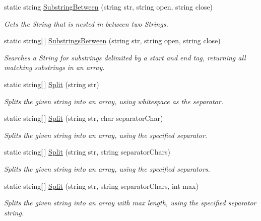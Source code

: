 \begin{DoxyCompactItemize}
static string \hyperlink{class_ultimate_1_1_utilities_1_1_string_utils_a3a7b9f9b846e3a21d7797a03303fc462}{Substring\+Between} (string str, string open, string close)
\begin{DoxyCompactList}\small\item\em Gets the String that is nested in between two Strings. \end{DoxyCompactList}\item 
static string\mbox{[}$\,$\mbox{]} \hyperlink{class_ultimate_1_1_utilities_1_1_string_utils_a5537aa0923c98cae70703547aed17c9e}{Substrings\+Between} (string str, string open, string close)
\begin{DoxyCompactList}\small\item\em Searches a String for substrings delimited by a start and end tag, returning all matching substrings in an array. \end{DoxyCompactList}\item 
static string\mbox{[}$\,$\mbox{]} \hyperlink{class_ultimate_1_1_utilities_1_1_string_utils_ad3053f61fb45c8b2778123fb8eb694d3}{Split} (string str)
\begin{DoxyCompactList}\small\item\em Splits the given string into an array, using whitespace as the separator. \end{DoxyCompactList}\item 
static string\mbox{[}$\,$\mbox{]} \hyperlink{class_ultimate_1_1_utilities_1_1_string_utils_a100a364d1b6f43f4d9812e3537676da8}{Split} (string str, char separator\+Char)
\begin{DoxyCompactList}\small\item\em Splits the given string into an array, using the specified separator. \end{DoxyCompactList}\item 
static string\mbox{[}$\,$\mbox{]} \hyperlink{class_ultimate_1_1_utilities_1_1_string_utils_af7d7299b4e4e05266f5dc8d55689d229}{Split} (string str, string separator\+Chars)
\begin{DoxyCompactList}\small\item\em Splits the given string into an array, using the specified separators. \end{DoxyCompactList}\item 
static string\mbox{[}$\,$\mbox{]} \hyperlink{class_ultimate_1_1_utilities_1_1_string_utils_a62801176388a0eb0a0c2ab59f6a382fb}{Split} (string str, string separator\+Chars, int max)
\begin{DoxyCompactList}\small\item\em Splits the given string into an array with max length, using the specified separator string. \end{DoxyCompactList}\item 

\end{DoxyCompactItemize}
